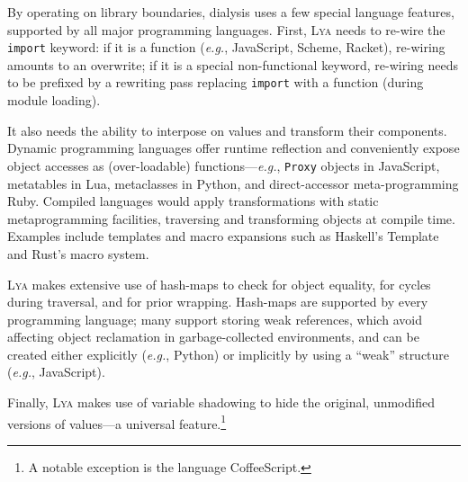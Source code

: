 \documentclass[letterpaper,twocolumn,10pt]{article}
\def\eg{{\em e.g.}, }
\def\ie{{\em i.e.}, }
\newcommand{\ttt}[1]{\texttt{#1}}
\newcommand{\sys}{{\scshape Lya}\xspace}
\begin{document}
By operating on library boundaries, dialysis uses a few special language features, supported by all major programming languages.
First, \sys needs to re-wire the \ttt{import} keyword:
  if it is a function (\eg JavaScript, Scheme, Racket), re-wiring amounts to an overwrite;
  if it is a special non-functional keyword, re-wiring needs to be prefixed by a rewriting pass replacing \ttt{import} with a function (during module loading).

It also needs the ability to interpose on values and transform their components.
Dynamic programming languages offer runtime reflection and conveniently expose object accesses as (over-loadable) functions---\eg \ttt{Proxy} objects in JavaScript, metatables in Lua, metaclasses in Python, and direct-accessor meta-programming Ruby.
Compiled languages would apply transformations with static metaprogramming facilities, traversing and transforming objects at compile time.
Examples include templates and macro expansions such as Haskell's Template and Rust's macro system.

\sys makes extensive use of hash-maps to check for object equality, for cycles during traversal, and for prior wrapping.
Hash-maps are supported by every programming language; many support storing weak references, which avoid affecting object reclamation in garbage-collected environments, and can be created either explicitly (\eg Python) or implicitly by using a ``weak'' structure (\eg JavaScript).

Finally, \sys makes use of variable shadowing to hide the original, unmodified versions of values---a universal feature.\footnote{
  A notable exception is the language CoffeeScript. %
}
\end{document}
